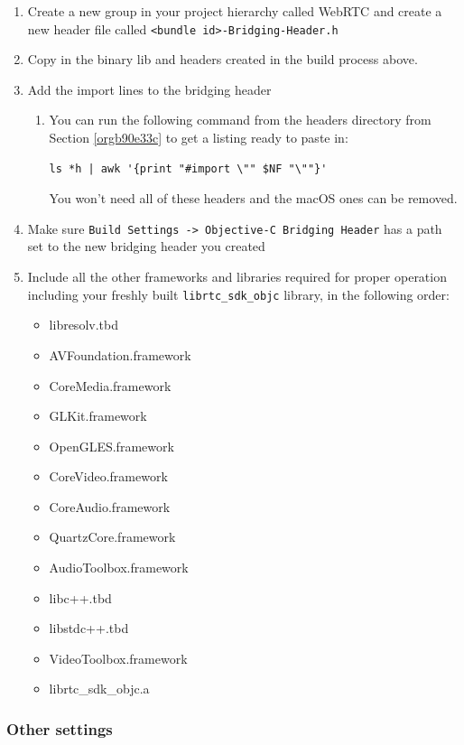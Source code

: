 \documentclass[a4paper,11pt]{article}
\begin{document}
\begin{enumerate}
\begin{enumerate}
\begin{enumerate}
\item Create a new group in your project hierarchy called WebRTC and
create a new header file called \texttt{<bundle id>-Bridging-Header.h}
\item Copy in the binary lib and headers created in the build process above.
\item Add the import lines to the bridging header
\begin{enumerate}
\item You can run the following command from the headers directory from Section \ref{orgb90e33c} to
get a listing ready to paste in:
\begin{verbatim}
ls *h | awk '{print "#import \"" $NF "\""}'
\end{verbatim}
You won't need all of these headers and the macOS ones can be
removed.
\end{enumerate}
\item Make sure \texttt{Build Settings -> Objective-C Bridging Header} has a
path set to the new bridging header you created
\item Include all the other frameworks and libraries required for proper
operation including your freshly built \texttt{librtc\_sdk\_objc} library,
in the following order:
\begin{itemize}
\item libresolv.tbd
\item AVFoundation.framework
\item CoreMedia.framework
\item GLKit.framework
\item OpenGLES.framework
\item CoreVideo.framework
\item CoreAudio.framework
\item QuartzCore.framework
\item AudioToolbox.framework
\item libc++.tbd
\item libstdc++.tbd
\item VideoToolbox.framework
\item librtc\_sdk\_objc.a
\end{itemize}
\end{enumerate}
\end{enumerate}
\end{enumerate}
\subsubsection{Other settings}
\label{sec:org8017736}
\end{document}
